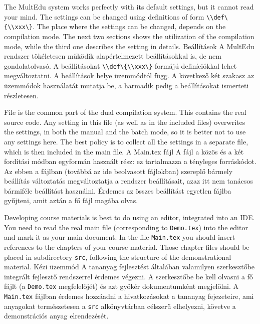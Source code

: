 





{
The MultEdu system works perfectly with its default settings, but it cannot read your mind.
The settings can be changed using definitions of form \lstinline|\\def\{\\xxx\}|.
The place where the settings can be changed, depends on the compilation mode.
The next two sections shows the utilization of the compilation mode,
while the third one describes the setting in details.
}
{Beállítások}
{
A MultEdu rendszer tökéletesen működik alapértelmezett beállításokkal is,
de nem gondolatolvasó. A beállításokat \lstinline|\\def\{\\xxx\}| formájú definíciókkal
lehet megváltoztatni. A beállítások helye üzemmódtól függ. A következő két szakasz 
az üzemmódok használatát mutatja be, a harmadik pedig a beállításokat ismerteti részletesen.
}

{
File  is the common part of the dual compilation system. 
This contains the real source code. Any setting in this file (as well as in the included files)
overwrites the settings, in both the manual and the batch mode, so it is better
not to use any settings here. The best policy is to collect all the settings
in a separate file, which is then included in the main file.
}
{A Main.tex fájl}
{
A  fájl a közös és a két fordítási módban egyformán használt rész:
ez tartalmazza a tényleges forráskódot. Az ebben a fájlban (továbbá az ide beolvasott fájlokban)
szereplő bármely beállítás változtatás megváltoztatja a rendszer beállításait,
azaz itt nem tanácsos bármiféle beállítást használni. Érdemes az összes beállítást 
egyetlen fájlba gyűjteni, amit aztán a fő fájl magába olvas.
}


{
Developing course materials is best to do using an editor, integrated into an IDE.
You need to read the real main file (corresponding to \lstinline|Demo.tex|) into the
editor and mark it as your main document. 
In the file \lstinline|Main.tex| you should insert references to the chapters of your course material.
Those chapter files should be placed in subdirectory \lstinline|src|, following the structure of 
the demonstrational material.
}
{Kézi üzemmód}
{
A tananyag fejlesztést általában valamilyen szerkesztőbe integrált fejlesztő rendszerrel
érdemes végezni. A szerkesztőbe be kell olvasni a fő fájlt (a \lstinline|Demo.tex| megfelelőjét)
és azt gyökér dokumentumként megjelölni.
A \lstinline|Main.tex| fájlban érdemes hozzáadni a hivatkozásokat a tananyag fejezeteire, ami anyagokat
természetesen a \lstinline|src| alkönyvtárban célszerű elhelyezni, követve a demonstrációs anyag elrendezését.
}

